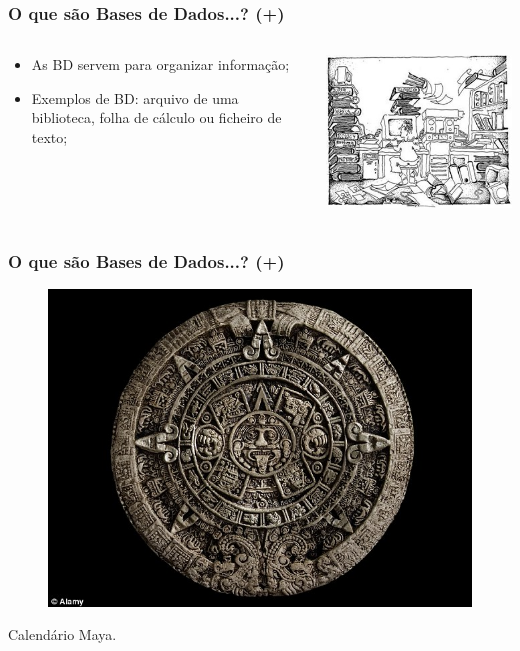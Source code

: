 \documentclass[hyperref={pdfpagelabels=true}]{beamer}
\begin{document}
\begin{frame}
\frametitle{O que s\~{a}o Bases de Dados...? (+)}
\begin{columns}
  \begin{column}{7cm}
    \begin{itemize}
      \item<2-> As BD servem para organizar informa\c{c}\~{a}o;
      \item<3-> Exemplos de BD: arquivo de uma biblioteca, folha de c\'{a}lculo ou ficheiro de texto;
    \end{itemize}
  \end{column}
  \begin{column}{10cm}
    \includegraphics[scale=0.4]{informationoverloadcartoon.jpg}
  \end{column}  
\end{columns}
\end{frame}

\begin{frame}
\frametitle{O que s\~{a}o Bases de Dados...? (+)}
\begin{overprint}
\begin{figure}
\includegraphics[scale=0.3]{mayas.jpg}
\end{figure}
Calend\'{a}rio Maya.\\
\end{overprint}
\end{frame}
\end{document}
